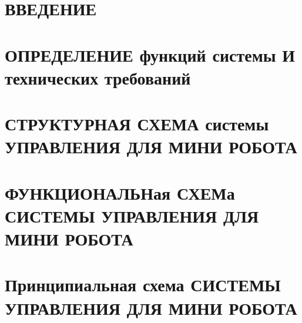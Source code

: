 
\section*{ВВЕДЕНИЕ}


\section{ОПРЕДЕЛЕНИЕ функций системы И технических требований}


\section{СТРУКТУРНАЯ СХЕМА системы УПРАВЛЕНИЯ ДЛЯ МИНИ РОБОТА }


\section{ФУНКЦИОНАЛЬНая СХЕМа СИСТЕМЫ УПРАВЛЕНИЯ ДЛЯ МИНИ РОБОТА}


\section{Принципиальная схема СИСТЕМЫ УПРАВЛЕНИЯ ДЛЯ МИНИ РОБОТА}








% 
